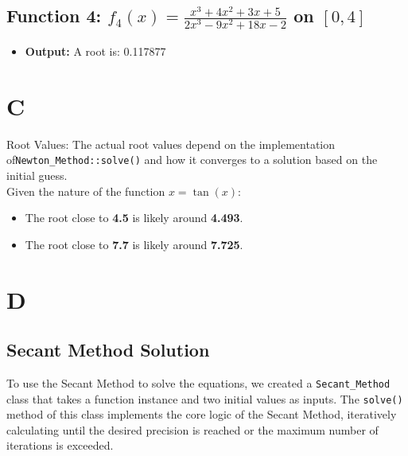 \documentclass[a4paper]{article}
\begin{document}
\subsection{Function 4: \(f_4(x) = \frac{x^3 + 4x^2 + 3x + 5}{2x^3 - 9x^2 + 18x - 2}\) on \([0, 4]\)}
\begin{itemize}
    \item \textbf{Output:} A root is: 0.117877
\end{itemize}

\section{C}
Root Values: The actual root values depend on the implementation of\texttt{Newton\_Method::solve()} and how it converges to a solution based on the initial guess.\\
    Given the nature of the function \(x = \tan(x)\):
    \begin{itemize}
        \item The root close to \textbf{4.5} is likely around \textbf{4.493}.
        \item The root close to \textbf{7.7} is likely around \textbf{7.725}.
    \end{itemize}
    
\section{D}
\subsection{Secant Method Solution}

To use the Secant Method to solve the equations, we created a \texttt{Secant\_Method} class that takes a function instance and two initial values as inputs. The \texttt{solve()} method of this class implements the core logic of the Secant Method, iteratively calculating until the desired precision is reached or the maximum number of iterations is exceeded.
\end{document}
